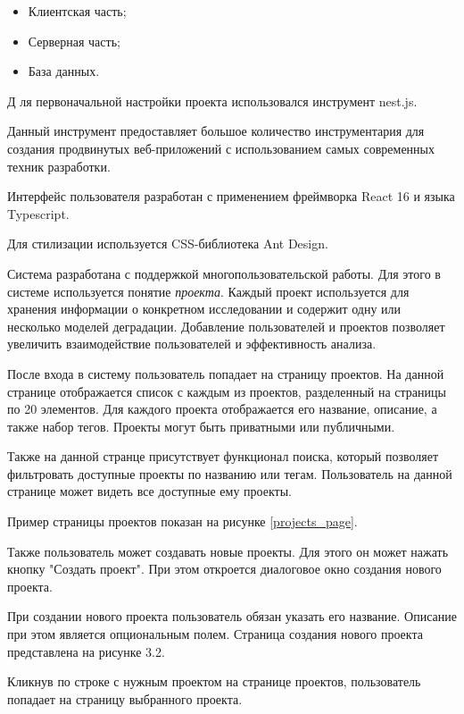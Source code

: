 \begin{itemize}
    \item Клиентская часть;
    \item Серверная часть;
    \item База данных.
\end{itemize}
Д
ля первоначальной настройки проекта использовался инструмент nest.js. 

Данный инструмент предоставляет большое количество инструментария для создания продвинутых веб-приложений с использованием самых современных техник разработки.

Интерфейс пользователя разработан с применением фреймворка React 16 и языка Typescript.

Для стилизации используется CSS-библиотека Ant Design.

Система разработана с поддержкой многопользовательской работы. 
Для этого в системе используется понятие \emph{проекта}. 
Каждый проект используется для хранения информации о конкретном исследовании и содержит одну или несколько моделей деградации. 
Добавление пользователей и проектов позволяет увеличить взаимодействие пользователей и эффективность анализа. 

После входа в систему пользователь попадает на страницу проектов.
На данной странице отображается список с каждым из проектов, разделенный на страницы по 20 элементов.
Для каждого проекта отображается его название, описание, а также набор тегов. 
Проекты могут быть приватными или публичными.

Также на данной странце присутствует функционал поиска, который позволяет фильтровать доступные проекты по названию или тегам.
Пользователь на данной странице может видеть все доступные ему проекты.

Пример страницы проектов показан на рисунке \ref{projects_page}.


Также пользователь может создавать новые проекты. 
Для этого он может нажать кнопку "Создать проект". 
При этом откроется диалоговое окно создания нового проекта.

При создании нового проекта пользователь обязан указать его название. Описание при этом является опциональным полем.
Страница создания нового проекта представлена на рисунке 3.2.


Кликнув по строке с нужным проектом на странице проектов, пользователь попадает на страницу выбранного проекта.

